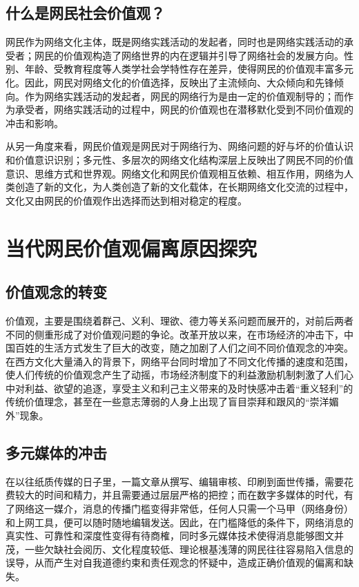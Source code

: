 \documentclass[UTF8]{ctexart}
\begin{document}
	\subsection{什么是网民社会价值观？}
	网民作为网络文化主体，既是网络实践活动的发起者，同时也是网络实践活动的承受者；网民的价值观构造了网络世界的内在逻辑并引导了网络社会的发展方向。性别、年龄、受教育程度等人类学社会学特性存在差异，使得网民的价值观丰富多元化。因此，网民对网络文化的价值选择，反映出了主流倾向、大众倾向和先锋倾向\cite{TKY}。作为网络实践活动的发起者，网民的网络行为是由一定的价值观制导的；而作为承受者，网络实践活动的过程中，网民的价值观也在潜移默化受到不同价值观的冲击和影响。
	\par{从另一角度来看，网民价值观是网民对于网络行为、网络问题的好与坏的价值认识和价值意识识别；多元性、多层次的网络文化结构深层上反映出了网民不同的价值意识、思维方式和世界观。网络文化和网民价值观相互依赖、相互作用，网络为人类创造了新的文化，为人类创造了新的文化载体\cite{WN}，在长期网络文化交流的过程中，文化又由网民的价值观作出选择而达到相对稳定的程度。}
\section{当代网民价值观偏离原因探究}
	\subsection{价值观念的转变}
	价值观，主要是围绕着群己、义利、理欲、德力等关系问题而展开的，对前后两者不同的侧重形成了对价值观问题的争论\cite{CZL}。改革开放以来，在市场经济的冲击下，中国百姓的生活方式发生了巨大的改变，随之加剧了人们之间不同价值观念的冲突。在西方文化大量涌入的背景下，网络平台同时增加了不同文化传播的速度和范围，使人们传统的价值观念产生了动摇，市场经济制度下的利益激励机制刺激了人们心中对利益、欲望的追逐，享受主义和利己主义带来的及时快感冲击着“重义轻利”的传统价值理念，甚至在一些意志薄弱的人身上出现了盲目崇拜和跟风的“崇洋媚外”现象。
	\subsection{多元媒体的冲击}
	在以往纸质传媒的日子里，一篇文章从撰写、编辑审核、印刷到面世传播，需要花费较大的时间和精力，并且需要通过层层严格的把控；而在数字多媒体的时代，有了网络这一媒介，消息的传播门槛变得非常低，任何人只需一个马甲（网络身份）和上网工具，便可以随时随地编辑发送。因此，在门槛降低的条件下，网络消息的真实性、可靠性和深度性变得有待商榷，同时多元媒体技术使得消息能够图文并茂，一些欠缺社会阅历、文化程度较低、理论根基浅薄的网民往往容易陷入信息的误导，从而产生对自我道德约束和责任观念的怀疑中，造成正确价值观的偏离和缺失。
\end{document}
